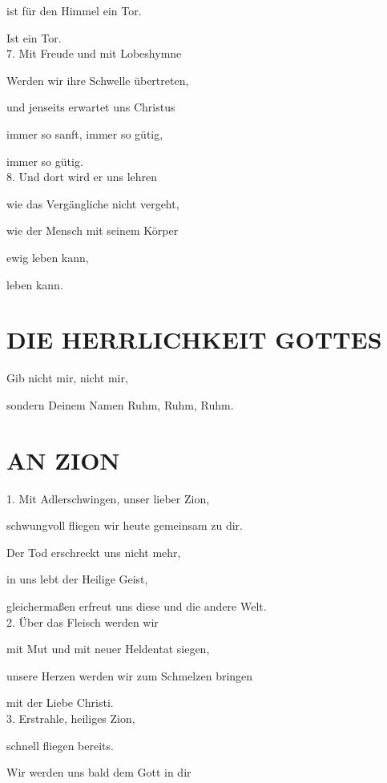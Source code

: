 \documentclass[11pt,a5paper,twoside]{article}
\begin{document}
ist für den Himmel ein Tor.

Ist ein Tor.\\

7. Mit Freude und mit Lobeshymne

Werden wir ihre Schwelle übertreten,

und jenseits erwartet uns Christus

immer so sanft, immer so gütig,

immer so gütig.\\

8. Und dort wird er uns lehren

wie das Vergängliche nicht vergeht,

wie der Mensch mit seinem Körper

ewig leben kann,

leben kann.\\


\section[Die Herrlichkeit Gottes]{DIE HERRLICHKEIT GOTTES}

Gib nicht mir, nicht mir, 

sondern Deinem Namen Ruhm, Ruhm, Ruhm.

\section[An Zion]{AN ZION}

1. Mit Adlerschwingen, unser lieber Zion, 

schwungvoll fliegen wir heute gemeinsam zu dir.

Der Tod erschreckt uns nicht mehr, 

in uns lebt der Heilige Geist, 

gleichermaßen erfreut uns diese und die andere Welt.\\


2. Über das Fleisch werden wir 

mit Mut und mit neuer Heldentat siegen, 

unsere Herzen werden wir zum Schmelzen bringen

mit der Liebe Christi.\\


3. Erstrahle, heiliges Zion,

schnell fliegen bereits.

Wir werden uns  bald dem Gott in dir
\end{document}
